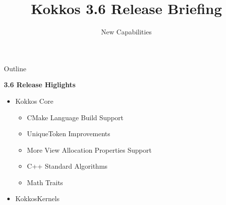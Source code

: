 
\usepackage{tikz}
\graphicspath{{3_6/figures/}}
\def\sandid{SAND2020-7755 PE}

\title{Kokkos 3.6 Release Briefing}

\author{New Capabilities}




\shorttrue
\mediumfalse
\fullfalse



\begin{frame}
	\titlepage
\end{frame}


\begin{frame}[fragile]{Outline}

\textbf{3.6 Release Higlights}

\begin{itemize}
   \item{Kokkos Core}
   \begin{itemize}
     \item{CMake Language Build Support}
     \item{UniqueToken Improvements}	     
     \item{More View Allocation Properties Support}
     \item{C++ Standard Algorithms}
     \item{Math Traits}
   \end{itemize}
   \item{KokkosKernels}
\end{itemize}

\end{frame}

